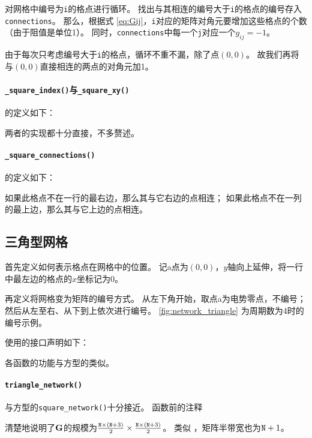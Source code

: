 对网格中编号为\verb|i|的格点进行循环。
找出与其相连的编号大于\verb|i|的格点的编号存入\verb|connections|。
那么，根据式 \eqref{eq:Gij}，\verb|i|对应的矩阵对角元要增加这些格点的个数（由于阻值是单位1）。
同时，\verb|connections|中每一个\verb|j|对应一个$g_{ij}=-1$。

由于每次只考虑编号大于\verb|i|的格点，循环不重不漏，除了点$(0,0)$。
故我们再将与$(0,0)$直接相连的两点的对角元加1。

\paragraph{\texttt{\_square\_index()}与\texttt{\_square\_xy()}}
的定义如下：
{
    \linespread{1.0}
    
    
}

两者的实现都十分直接，不多赘述。

\paragraph{\texttt{\_square\_connections()}}
的定义如下：
{
    \linespread{1.0}
    
}
如果此格点不在一行的最右边，那么其与它右边的点相连；
如果此格点不在一列的最上边，那么其与它上边的点相连。

\subsection{三角型网格}\label{ssec:triangle}
首先定义如何表示格点在网格中的位置。
记a点为$(0,0)$，$y$轴向上延伸，将一行中最左边的格点的$x$坐标记为0。

再定义将网格变为矩阵的编号方式。
从左下角开始，取点a为电势零点，不编号；然后从左至右、从下到上依次进行编号。
\autoref{fig:network_triangle} 为周期数为4时的编号示例。

使用的接口声明如下：
{
    \linespread{1.0}
    
}
各函数的功能与方型的类似。

\paragraph{\texttt{triangle\_network()}}\label{para:tri_net}
与方型的\verb|square_network()|十分接近。
函数前的注释{
    \linespread{1.0}
    
}清楚地说明了$\vb{G}$的规模为$\frac{\text{\texttt{N}}\times(\text{\texttt{N}}+3)}{2}\times\frac{\text{\texttt{N}}\times(\text{\texttt{N}}+3)}{2}$。
类似 ，矩阵半带宽也为$\text{\texttt{N}}+1$。

